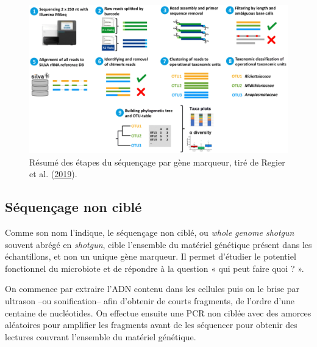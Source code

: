 \documentclass[12pt,a4paper]{reedthesis}
\theoremstyle{definition}
\theoremstyle{definition}
\theoremstyle{definition}
\theoremstyle{remark}
\begin{document}
\begin{figure}[!t]

{\centering \includegraphics[width=0.9\linewidth]{img/16s} 

}

\caption{Résumé des étapes du séquençage par gène marqueur, tiré de Regier et al. (\protect\hyperlink{ref-regier2019combination}{2019}).}\label{fig:16s}
\end{figure}
\hypertarget{suxe9quenuxe7age-non-cibluxe9}{%
\subsection{Séquençage non ciblé}\label{suxe9quenuxe7age-non-cibluxe9}}

Comme son nom l'indique, le séquençage non ciblé, ou \emph{whole genome shotgun} souvent abrégé en \emph{shotgun}, cible l'ensemble du matériel génétique présent dans les échantillons, et non un unique gène marqueur. Il permet d'étudier le potentiel fonctionnel du microbiote et de répondre à la question « qui peut faire quoi ? ».

On commence par extraire l'ADN contenu dans les cellules puis on le brise par ultrason --ou sonification-- afin d'obtenir de courts fragments, de l'ordre d'une centaine de nucléotides. On effectue ensuite une PCR non ciblée avec des amorces aléatoires pour amplifier les fragments avant de les séquencer pour obtenir des lectures couvrant l'ensemble du matériel génétique.
\end{document}
